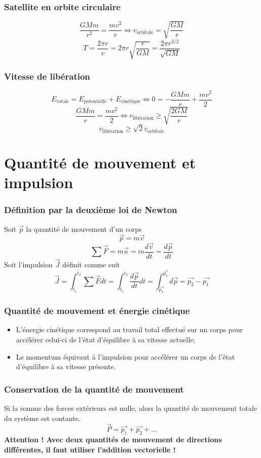\section{Satellite en orbite circulaire}
\[ \frac{GMm}{r^2} = \frac{mv^2}{r} \Leftrightarrow v_\mathrm{orbitale}
= \sqrt{\frac{GM}{r}} \]
\[ T = \frac{2\pi r}{v} = 2\pi r \sqrt{\frac{r}{GM}}
= \frac{2\pi r^{3/2}}{\sqrt{GM}} \]

\section{Vitesse de libération}
\[ E_\mathrm{totale} =
  E_\mathrm{potentielle} + E_{\text{cinétique}} \Leftrightarrow 0
= -\frac{GMm}{r} + \frac{mv^2}{2} \]
\[ \frac{GMm}{r} = \frac{mv^2}{2} \Leftrightarrow v_{\text{libération}}
\geq \sqrt{\frac{2GM}{r}} \]
\[ v_{\text{libération}} \geq \sqrt{2}v_\mathrm{orbitale} \]

\part{Quantité de mouvement et impulsion}
\section{Définition par la deuxième loi de Newton}
Soit $\vec{p}$ la quantité de mouvement d'un corps
\[ \vec{p} = m\vec{v} \]
\[ \sum \vec{F} = m\vec{a} = m\frac{d\vec{v}}{dt} = \frac{d\vec{p}}{dt} \]
Soit l'impulsion $\vec{J}$ définit comme suit
\[ \vec{J} = \int_{t_1}^{t_2} \sum\vec{F} dt =
  \int_{t_1}^{t_2}\frac{d\vec{p}}{dt} dt =
\int_{\vec{p_1}}^{\vec{p_2}} d\vec{p} = \vec{p_2} - \vec{p_1} \]

\section{Quantité de mouvement et énergie cinétique}
\begin{itemize}
  \item L'énergie cinétique correspond au travail total effectué sur un corps
    pour accélérer celui-ci de l'état d'équilibre à sa vitesse actuelle;
  \item Le momentum équivaut à l'impulsion pour accélérer
    un corps de l'état d'équilibre à sa vitesse présente.
\end{itemize}

\section{Conservation de la quantité de mouvement}
Si la somme des forces extérieurs est nulle,
alors la quantité de mouvement totale du système est contante.
\[ \vec{P} = \vec{p_1} + \vec{p_2} + ... \]
{\bf Attention ! Avec deux quantités de mouvement de directions différentes,
il faut utiliser l'addition vectorielle !}

